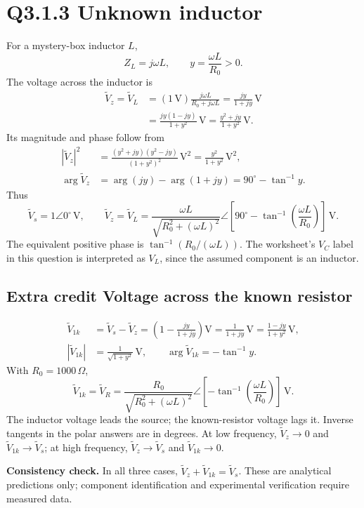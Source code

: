 \documentclass[11pt,letterpaper]{article}
\newcommand{\Vs}{\widetilde V_s}
\newcommand{\Vz}{\widetilde V_z}
\newcommand{\Vk}{\widetilde V_{1k}}
\begin{document}
\section*{Q3.1.3 Unknown inductor}
For a mystery-box inductor $L$,
\[
Z_L=j\omega L,\qquad y=\frac{\omega L}{R_0}>0.
\]
The voltage across the inductor is
\begin{align*}
\Vz=\widetilde V_L
&=(1\,\mathrm V)\frac{j\omega L}{R_0+j\omega L}
=\frac{jy}{1+jy}\,\mathrm V\\
&=\frac{jy(1-jy)}{1+y^2}\,\mathrm V
=\frac{y^2+jy}{1+y^2}\,\mathrm V.
\end{align*}
Its magnitude and phase follow from
\begin{align*}
|\Vz|^2&=\frac{(y^2+jy)(y^2-jy)}{(1+y^2)^2}\,\mathrm V^2
=\frac{y^2}{1+y^2}\,\mathrm V^2,\\
\arg\Vz&=\arg(jy)-\arg(1+jy)
=90^\circ-\tan^{-1}y.
\end{align*}
Thus
\[
\boxed{\Vs=1\angle0^\circ\,\mathrm V},\qquad
\boxed{\Vz=\widetilde V_L=
\frac{\omega L}{\sqrt{R_0^2+(\omega L)^2}}
\angle\!\left[90^\circ-\tan^{-1}\!\left(\frac{\omega L}{R_0}\right)\right]\,\mathrm V}.
\]
The equivalent positive phase is $\tan^{-1}(R_0/(\omega L))$.
The worksheet's $V_C$ label in this question is interpreted as $V_L$,
since the assumed component is an inductor.
\subsection*{Extra credit Voltage across the known resistor}
\begin{align*}
\Vk&=\Vs-\Vz
=\left(1-\frac{jy}{1+jy}\right)\mathrm V
=\frac{1}{1+jy}\,\mathrm V
=\frac{1-jy}{1+y^2}\,\mathrm V,\\
|\Vk|&=\frac{1}{\sqrt{1+y^2}}\,\mathrm V,\qquad
\arg\Vk=-\tan^{-1}y.
\end{align*}
With $R_0=1000\,\Omega$,
\[
\boxed{\Vk=\widetilde V_R=
\frac{R_0}{\sqrt{R_0^2+(\omega L)^2}}
\angle\!\left[-\tan^{-1}\!\left(\frac{\omega L}{R_0}\right)\right]\,\mathrm V}.
\]
The inductor voltage leads the source; the known-resistor voltage lags it.
Inverse tangents in the polar answers are in degrees. At low frequency,
$\Vz\to0$ and $\Vk\to\Vs$; at high frequency,
$\Vz\to\Vs$ and $\Vk\to0$.

\textbf{Consistency check.} In all three cases,
$\Vz+\Vk=\Vs$. These are analytical predictions only;
component identification and experimental verification require measured data.
\end{document}
